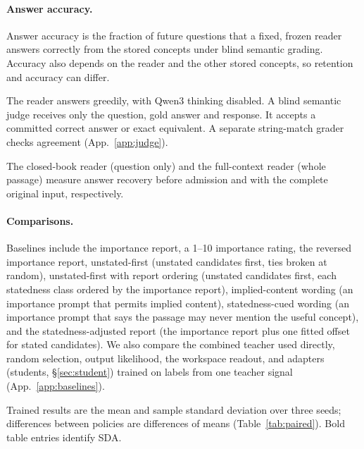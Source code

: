 \paragraph{Answer accuracy.}
Answer accuracy is the fraction of future questions that a fixed,
frozen reader answers correctly from the stored concepts under blind
semantic grading. Accuracy also depends on the reader and the other
stored concepts, so retention and accuracy can differ.

The reader answers greedily, with Qwen3 thinking disabled. A blind
semantic judge receives only the question, gold answer and response.
It accepts a committed correct answer or exact equivalent. A separate
string-match grader checks agreement (App.~\ref{app:judge}).

The closed-book reader (question only) and the full-context reader
(whole passage) measure answer recovery before admission and with the
complete original input, respectively.

\paragraph{Comparisons.}
Baselines include the importance report, a 1--10 importance rating,
the reversed importance report, unstated-first (unstated candidates
first, ties broken at random), unstated-first with report ordering
(unstated candidates first, each statedness class ordered by the
importance report), implied-content wording (an importance prompt
that permits implied content), statedness-cued wording (an importance
prompt that says the passage may never mention the useful concept),
and the statedness-adjusted report (the importance report plus one
fitted offset for stated candidates). We also compare the combined
teacher used directly, random selection, output likelihood, the
workspace readout, and adapters
(students, \S\ref{sec:student}) trained on labels from one teacher
signal (App.~\ref{app:baselines}).

Trained results are the mean and sample standard deviation over three
seeds; differences between policies are differences of means
(Table~\ref{tab:paired}). Bold table entries identify SDA.


